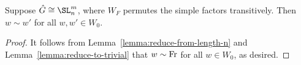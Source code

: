 \begin{lemma}\label{lemma:type-a-weyl-equivalence}
    Suppose $\hat{G} \cong \SL_n^m$, where $W_F$ permutes the simple factors transitively. Then $w \sim w'$ for all $w, w' \in W_0$.
\end{lemma}

\begin{proof}
    It follows from Lemma~\ref{lemma:reduce-from-length-n} and Lemma~\ref{lemma:reduce-to-trivial} that $w \sim \rm{Fr}$ for all $w \in W_0$, as desired.
\end{proof}


































